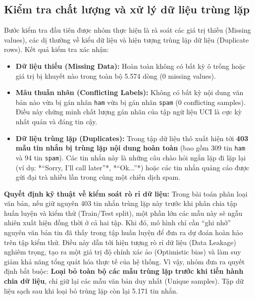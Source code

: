 \subsection{Kiểm tra chất lượng và xử lý dữ liệu trùng lặp}
Bước kiểm tra đầu tiên được nhóm thực hiện là rà soát các giá trị thiếu (Missing values), các dị thường về kiểu dữ liệu và hiện tượng trùng lặp dữ liệu (Duplicate rows).
Kết quả kiểm tra xác nhận:
\begin{itemize}
    \item \textbf{Dữ liệu thiếu (Missing Data):} Hoàn toàn không có bất kỳ ô trống hoặc giá trị bị khuyết nào trong toàn bộ 5.574 dòng ($0$ missing values).
    \item \textbf{Mâu thuẫn nhãn (Conflicting Labels):} Không có bất kỳ nội dung văn bản nào vừa bị gán nhãn \texttt{ham} vừa bị gán nhãn \texttt{spam} ($0$ conflicting samples). Điều này chứng minh chất lượng gán nhãn của tập ngữ liệu UCI là cực kỳ nhất quán và đáng tin cậy.
    \item \textbf{Dữ liệu trùng lặp (Duplicates):} Trong tập dữ liệu thô xuất hiện tới \textbf{403 mẫu tin nhắn bị trùng lặp nội dung hoàn toàn} (bao gồm 309 tin \texttt{ham} và 94 tin \texttt{spam}). Các tin nhắn này là những câu chào hỏi ngắn lặp đi lặp lại (ví dụ: *“Sorry, I'll call later”*, *“Ok...”*) hoặc các tin nhắn quảng cáo được gửi đại trà nhiều lần trong cùng một chiến dịch spam.
\end{itemize}

\textbf{Quyết định kỹ thuật về kiểm soát rò rỉ dữ liệu:} Trong bài toán phân loại văn bản, nếu giữ nguyên 403 tin nhắn trùng lặp này trước khi phân chia tập huấn luyện và kiểm thử (Train/Test split), một phần lớn các mẫu này sẽ ngẫu nhiên xuất hiện đồng thời ở cả hai tập. Khi đó, mô hình chỉ cần “ghi nhớ” nguyên văn bản tin đã thấy trong tập huấn luyện để đưa ra dự đoán hoàn hảo trên tập kiểm thử. Điều này dẫn tới hiện tượng rò rỉ dữ liệu (Data Leakage) nghiêm trọng, tạo ra một giá trị độ chính xác ảo (Optimistic bias) và làm suy giảm khả năng tổng quát hóa thực tế của hệ thống. Vì vậy, nhóm đưa ra quyết định bắt buộc: \textbf{Loại bỏ toàn bộ các mẫu trùng lặp trước khi tiến hành chia dữ liệu}, chỉ giữ lại các mẫu văn bản duy nhất (Unique samples). Tập dữ liệu sạch sau khi loại bỏ trùng lặp còn lại 5.171 tin nhắn.


